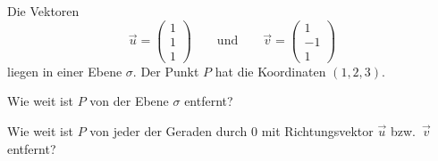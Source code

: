 Die Vektoren
\[
\vec u=\begin{pmatrix}1\\1\\1\end{pmatrix}
\qquad\text{und}\qquad
\vec v=\begin{pmatrix}1\\-1\\1\end{pmatrix}
\]
liegen in einer Ebene $\sigma$. Der Punkt $P$ hat die Koordinaten $(1,2,3)$.
\begin{teilaufgaben}
\item Wie weit ist $P$ von der Ebene $\sigma$ entfernt?
\item Wie weit ist $P$ von jeder der Geraden durch $0$ mit Richtungsvektor
$\vec{u}$ bzw.~$\vec{v}$ entfernt?
\end{teilaufgaben}

